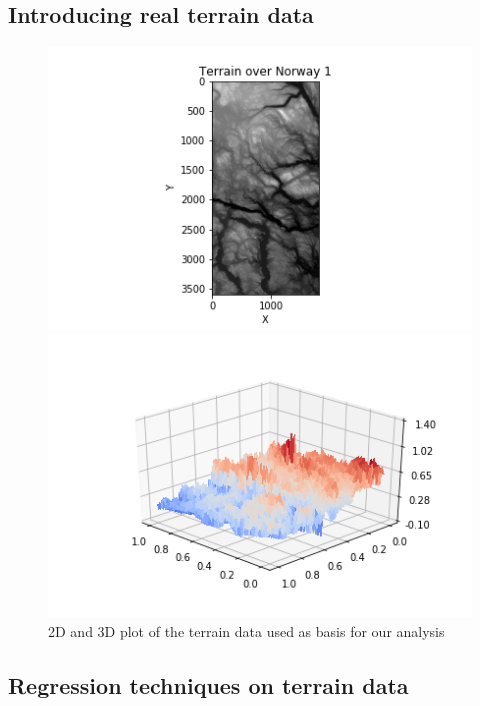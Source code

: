 \documentclass{article}
\begin{document}
\subsection{Introducing real terrain data}
\begin{figure}
\begin{minipage}{0.48\textwidth}
\centering
\includegraphics[width=1.5\linewidth]{terrain2dplot.png}
\end{minipage}
\begin{minipage}{\textwidth}

\includegraphics[width=0.7\linewidth]{rawdataplot.png}
\end{minipage}
\caption{2D and 3D plot of the terrain data used as basis for our analysis}
\end{figure}

\subsection{Regression techniques on terrain data}

\medskip
\end{document}
